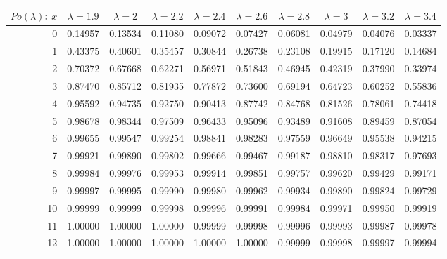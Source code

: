 \documentclass{article}
\begin{document}
{\vspace{8pt minus 6pt}
\begin{tabular}{|r|c|c|c|c|c|c|c|c|c|}
\hline
$Po(\lambda)$: $x$
   & $\lambda=1.9$ & $\lambda=2$ & $\lambda=2.2$ & $\lambda=2.4$ & $\lambda=2.6$ & $\lambda=2.8$ & $\lambda=3$ & $\lambda=3.2$ & $\lambda=3.4$ \\\hline
  0&0.14957&0.13534&0.11080&0.09072&0.07427&0.06081&0.04979&0.04076&0.03337\\
  1&0.43375&0.40601&0.35457&0.30844&0.26738&0.23108&0.19915&0.17120&0.14684\\
  2&0.70372&0.67668&0.62271&0.56971&0.51843&0.46945&0.42319&0.37990&0.33974\\
  3&0.87470&0.85712&0.81935&0.77872&0.73600&0.69194&0.64723&0.60252&0.55836\\
  4&0.95592&0.94735&0.92750&0.90413&0.87742&0.84768&0.81526&0.78061&0.74418\\
  5&0.98678&0.98344&0.97509&0.96433&0.95096&0.93489&0.91608&0.89459&0.87054\\
  6&0.99655&0.99547&0.99254&0.98841&0.98283&0.97559&0.96649&0.95538&0.94215\\
  7&0.99921&0.99890&0.99802&0.99666&0.99467&0.99187&0.98810&0.98317&0.97693\\
  8&0.99984&0.99976&0.99953&0.99914&0.99851&0.99757&0.99620&0.99429&0.99171\\
  9&0.99997&0.99995&0.99990&0.99980&0.99962&0.99934&0.99890&0.99824&0.99729\\
 10&0.99999&0.99999&0.99998&0.99996&0.99991&0.99984&0.99971&0.99950&0.99919\\
 11&1.00000&1.00000&1.00000&0.99999&0.99998&0.99996&0.99993&0.99987&0.99978\\
 12&1.00000&1.00000&1.00000&1.00000&1.00000&0.99999&0.99998&0.99997&0.99994\\
\hline
\end{tabular}

}
\end{document}
